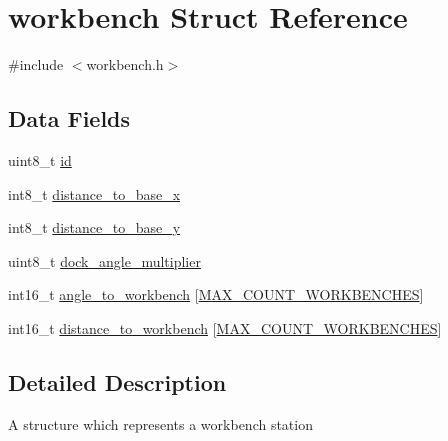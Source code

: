 \hypertarget{structworkbench}{\section{workbench \-Struct \-Reference}
\label{structworkbench}
}


{\ttfamily \#include $<$workbench.\-h$>$}

\subsection*{\-Data \-Fields}
\begin{DoxyCompactItemize}
\item 
uint8\-\_\-t \hyperlink{structworkbench_a1e6927fa1486224044e568f9c370519b}{id}
\item 
int8\-\_\-t \hyperlink{structworkbench_a31c15cc70543dfcb5e6954f6c41e8293}{distance\-\_\-to\-\_\-base\-\_\-x}
\item 
int8\-\_\-t \hyperlink{structworkbench_ae7ebe831a9960e3b79cdd96ab4c149a2}{distance\-\_\-to\-\_\-base\-\_\-y}
\item 
uint8\-\_\-t \hyperlink{structworkbench_ad9147c3eec2865f18724acafd59f7327}{dock\-\_\-angle\-\_\-multiplier}
\item 
int16\-\_\-t \hyperlink{structworkbench_a0142206cb187b4f67026aab9bd200f75}{angle\-\_\-to\-\_\-workbench} \mbox{[}\hyperlink{workbench_8h_acba125910e0f69e5c70d5c52a894b9ae}{\-M\-A\-X\-\_\-\-C\-O\-U\-N\-T\-\_\-\-W\-O\-R\-K\-B\-E\-N\-C\-H\-E\-S}\mbox{]}
\item 
int16\-\_\-t \hyperlink{structworkbench_a92acc2b5806eaa0de00fc068add07494}{distance\-\_\-to\-\_\-workbench} \mbox{[}\hyperlink{workbench_8h_acba125910e0f69e5c70d5c52a894b9ae}{\-M\-A\-X\-\_\-\-C\-O\-U\-N\-T\-\_\-\-W\-O\-R\-K\-B\-E\-N\-C\-H\-E\-S}\mbox{]}
\end{DoxyCompactItemize}


\subsection{\-Detailed \-Description}
\-A structure which represents a workbench station 


